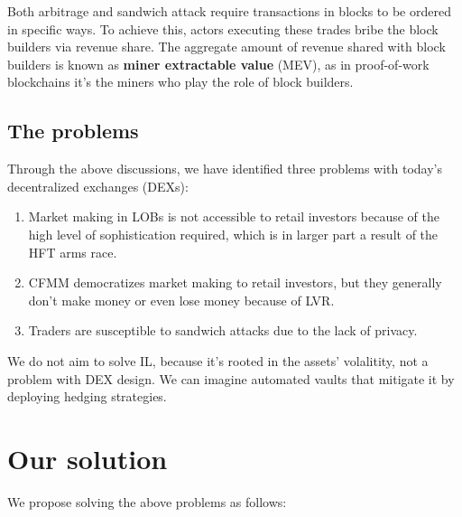 \documentclass{article}
\begin{document}
Both arbitrage and sandwich attack require transactions in blocks to be ordered in specific ways. To achieve this, actors executing these trades bribe the block builders via revenue share. The aggregate amount of revenue shared with block builders is known as \textbf{miner extractable value} (MEV), as in proof-of-work blockchains it's the miners who play the role of block builders.

\subsection{The problems}

Through the above discussions, we have identified three problems with today's decentralized exchanges (DEXs):

\begin{enumerate}
  \item Market making in LOBs is not accessible to retail investors because of the high level of sophistication required, which is in larger part a result of the HFT arms race.
  \item CFMM democratizes market making to retail investors, but they generally don't make money or even lose money because of LVR.
  \item Traders are susceptible to sandwich attacks due to the lack of privacy.
\end{enumerate}

We do not aim to solve IL, because it's rooted in the assets' volalitity, not a problem with DEX design. We can imagine automated vaults that mitigate it by deploying hedging strategies.

\section{Our solution}

We propose solving the above problems as follows:
\end{document}
